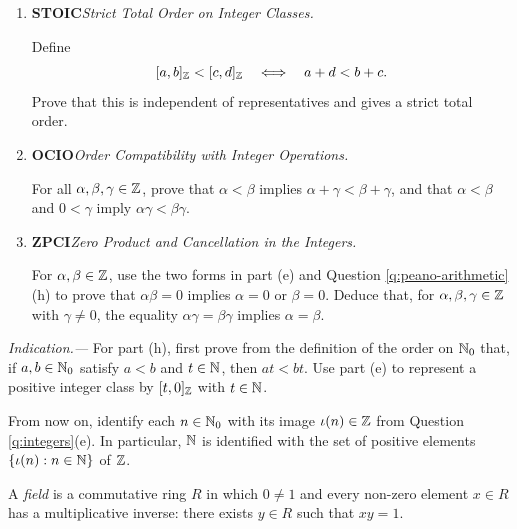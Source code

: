 \documentclass[10pt,a4paper]{article}
\newenvironment{subquestions}
  {\begin{enumerate}[label=\alph*),leftmargin=2.1em]}
  {\end{enumerate}}
\newcommand{\nameditem}[2]{%
  \textbf{\textsf{#1}}\enspace\emph{#2.}\enspace
}
\newcommand{\indication}[1]{%
  \par\smallskip\noindent\emph{Indication.---} #1\par
}
\begin{document}
{\begin{subquestions}
  operations.  Conclude that the quotient is a commutative ring.
  \item \nameditem{STOIC}{Strict Total Order on Integer Classes}
  Define
  \[
    [a,b]_{\mathbb{Z}}<[c,d]_{\mathbb{Z}}\quad\Longleftrightarrow\quad a+d<b+c.
  \]
  Prove that this is independent of representatives and gives a strict
  total order.
  \item \nameditem{OCIO}{Order Compatibility with Integer Operations}
  For all $\alpha,\beta,\gamma\in\mathbb{Z}$, prove that
  $\alpha<\beta$ implies $\alpha+\gamma<\beta+\gamma$, and that
  $\alpha<\beta$ and $0<\gamma$ imply
  $\alpha\gamma<\beta\gamma$.
  \item \nameditem{ZPCI}{Zero Product and Cancellation in the Integers}
  For $\alpha,\beta\in\mathbb{Z}$, use the two forms in part (e) and
  Question \ref{q:peano-arithmetic}(h) to prove that
  $\alpha\beta=0$ implies $\alpha=0$ or $\beta=0$.  Deduce that, for
  $\alpha,\beta,\gamma\in\mathbb{Z}$ with $\gamma\ne0$, the equality
  $\alpha\gamma=\beta\gamma$ implies $\alpha=\beta$.
\end{subquestions}}
\indication{For part (h), first prove from the definition of the order on
$\mathbb{N}_0$ that, if $a,b\in\mathbb{N}_0$ satisfy $a<b$ and $t\in\mathbb{N}$, then
$at<bt$.  Use part (e) to represent a positive integer class by
$[t,0]_{\mathbb{Z}}$ with $t\in\mathbb{N}$.}

From now on, identify each $n\in\mathbb{N}_0$ with its image
$\iota(n)\in\mathbb{Z}$ from Question \ref{q:integers}(e).  In particular,
$\mathbb{N}$ is identified with the set of positive elements
$\{\iota(n):n\in\mathbb{N}\}$ of $\mathbb{Z}$.

A \emph{field} is a commutative ring $R$ in which $0\ne1$ and every
non-zero element $x\in R$ has a multiplicative inverse: there exists
$y\in R$ such that $xy=1$.
\end{document}
